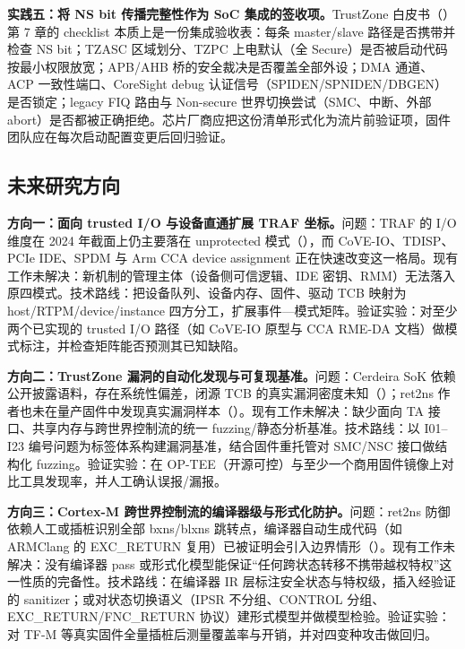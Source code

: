 \documentclass[11pt]{ctexart}
\begin{document}
\noindent\textbf{实践五：将 NS bit 传播完整性作为 SoC 集成的签收项。}TrustZone 白皮书（\cite{arm_trustzone_whitepaper}）第 7 章的 checklist 本质上是一份集成验收表：每条 master/slave 路径是否携带并检查 NS bit；TZASC 区域划分、TZPC 上电默认（全 Secure）是否被启动代码按最小权限放宽；APB/AHB 桥的安全裁决是否覆盖全部外设；DMA 通道、ACP 一致性端口、CoreSight debug 认证信号（SPIDEN/SPNIDEN/DBGEN）是否锁定；legacy FIQ 路由与 Non-secure 世界切换尝试（SMC、中断、外部 abort）是否都被正确拒绝。芯片厂商应把这份清单形式化为流片前验证项，固件团队应在每次启动配置变更后回归验证。\par

\subsection{未来研究方向}
\noindent\textbf{方向一：面向 trusted I/O 与设备直通扩展 TRAF 坐标。}问题：TRAF 的 I/O 维度在 2024 年截面上仍主要落在 unprotected 模式（\cite{li2024sokteechoices}），而 CoVE-IO、TDISP、PCIe IDE、SPDM 与 Arm CCA device assignment 正在快速改变这一格局。现有工作未解决：新机制的管理主体（设备侧可信逻辑、IDE 密钥、RMM）无法落入原四模式。技术路线：把设备队列、设备内存、固件、驱动 TCB 映射为 host/RTPM/device/instance 四方分工，扩展事件—模式矩阵。验证实验：对至少两个已实现的 trusted I/O 路径（如 CoVE-IO 原型与 CCA RME-DA 文档）做模式标注，并检查矩阵能否预测其已知缺陷。\par
\noindent\textbf{方向二：TrustZone 漏洞的自动化发现与可复现基准。}问题：Cerdeira SoK 依赖公开披露语料，存在系统性偏差，闭源 TCB 的真实漏洞密度未知（\cite{cerdeira2020trustzone}）；ret2ns 作者也未在量产固件中发现真实漏洞样本（\cite{ma2023ret2ns}）。现有工作未解决：缺少面向 TA 接口、共享内存与跨世界控制流的统一 fuzzing/静态分析基准。技术路线：以 I01--I23 编号问题为标签体系构建漏洞基准，结合固件重托管对 SMC/NSC 接口做结构化 fuzzing。验证实验：在 OP-TEE（开源可控）与至少一个商用固件镜像上对比工具发现率，并人工确认误报/漏报。\par
\noindent\textbf{方向三：Cortex-M 跨世界控制流的编译器级与形式化防护。}问题：ret2ns 防御依赖人工或插桩识别全部 bxns/blxns 跳转点，编译器自动生成代码（如 ARMClang 的 EXC\_RETURN 复用）已被证明会引入边界情形（\cite{ma2023ret2ns}）。现有工作未解决：没有编译器 pass 或形式化模型能保证``任何跨状态转移不携带越权特权''这一性质的完备性。技术路线：在编译器 IR 层标注安全状态与特权级，插入经验证的 sanitizer；或对状态切换语义（IPSR 不分组、CONTROL 分组、EXC\_RETURN/FNC\_RETURN 协议）建形式模型并做模型检验。验证实验：对 TF-M 等真实固件全量插桩后测量覆盖率与开销，并对四变种攻击做回归。\par
\end{document}
